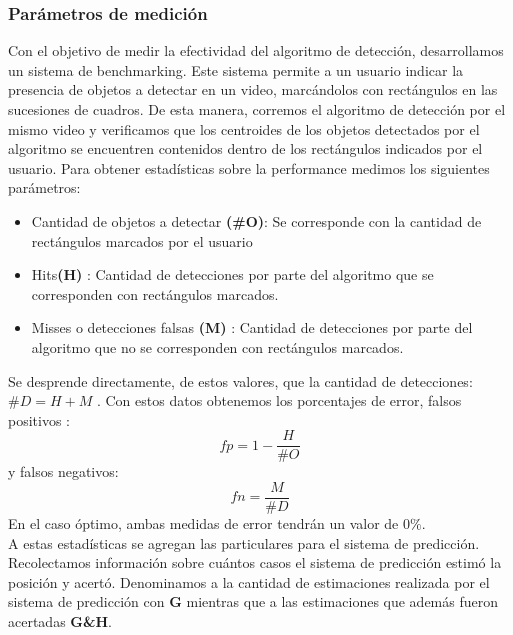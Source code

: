 \subsubsection{Par\'ametros de medici\'on}
Con el objetivo de  medir la efectividad del algoritmo de detecci\'on, desarrollamos un sistema de benchmarking. Este sistema permite
a un usuario indicar la presencia de objetos a detectar en un video, marc\'andolos con rect\'angulos en las sucesiones de cuadros. De esta
manera, corremos el algoritmo de detecci\'on por el mismo video y verificamos que los centroides de los objetos detectados por el algoritmo 
se encuentren contenidos dentro de los rect\'angulos indicados por el 
usuario. Para obtener estad\'isticas sobre la performance  
medimos los siguientes par\'ametros:
\begin{itemize}
\item { Cantidad de objetos a detectar \textbf{(\#O)}: Se corresponde con la cantidad de rect\'angulos marcados por el usuario}
\item { Hits\textbf{(H)} : Cantidad de detecciones por parte del algoritmo que se corresponden con rect\'angulos marcados.}
\item { Misses o detecciones falsas \textbf{(M)} : Cantidad de detecciones por parte del algoritmo que no se corresponden con rect\'angulos marcados.}
\end{itemize}
Se desprende directamente, de estos valores, que la cantidad de detecciones: 
\textbf{$\#D=H+M$} .
Con estos datos obtenemos los porcentajes de error, falsos positivos : 
\[
	fp=1 - \frac{H}{\# O}
\]
y falsos negativos:
\[
	fn=\frac{M}{\# D}
\]
En el caso \'optimo, ambas medidas de error tendr\'an un valor de $0\%$.  \\
\indent A estas estad\'isticas se agregan las particulares para el sistema de predicci\'on. Recolectamos informaci\'on sobre
cu\'antos casos el sistema de predicci\'on estim\'o la posici\'on y acert\'o. Denominamos
a la cantidad de estimaciones realizada por el sistema de predicci\'on 
con \textbf{G} mientras que a las estimaciones que adem\'as fueron 
acertadas \textbf{G\&H}.

